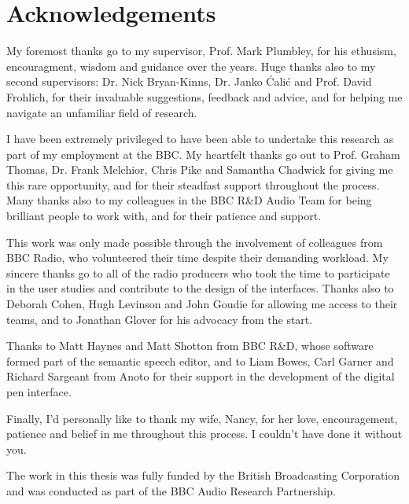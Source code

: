 \chapter*{Acknowledgements}

My foremost thanks go to my supervisor, Prof. Mark Plumbley, for his ethusism, encouragment, wisdom and guidance over
the years. Huge thanks also to my second supervisors: Dr. Nick Bryan-Kinns, Dr. Janko \'{C}ali\'{c} and Prof.  David
Frohlich, for their invaluable suggestions, feedback and advice, and for helping me navigate an unfamiliar field of
research.

I have been extremely privileged to have been able to undertake this research as part of my employment at the BBC.  My
heartfelt thanks go out to Prof. Graham Thomas, Dr. Frank Melchior, Chris Pike and Samantha Chadwick for giving me this
rare opportunity, and for their steadfast support throughout the process.  Many thanks also to my colleagues in the BBC
R\&D Audio Team for being brilliant people to work with, and for their patience and support.

This work was only made possible through the involvement of colleagues from BBC Radio, who volunteered their time
despite their demanding workload. My sincere thanks go to all of the radio producers who took the time to participate
in the user studies and contribute to the design of the interfaces. Thanks also to Deborah Cohen, Hugh Levinson and
John Goudie for allowing me access to their teams, and to Jonathan Glover for his advocacy from the start.

Thanks to Matt Haynes and Matt Shotton from BBC R\&D, whose software formed part of the semantic speech editor, and to
Liam Bowes, Carl Garner and Richard Sargeant from Anoto for their support in the development of the digital pen
interface. 

Finally, I'd personally like to thank my wife, Nancy, for her love, encouragement, patience and belief in me throughout
this process. I couldn't have done it without you.

\vfill
The work in this thesis was fully funded by the British Broadcasting Corporation and was conducted as part of the BBC
Audio Research Partnership.
